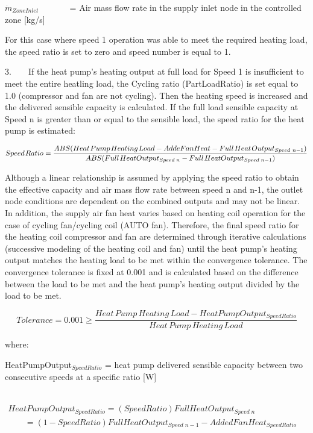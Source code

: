 \({{{\dot m}_{ZoneInlet}}}\) ~~~~~~ = Air mass flow rate in the supply inlet node in the controlled zone {[}kg/s{]}

For this case where speed 1 operation was able to meet the required heating load, the speed ratio is set to zero and speed number is equal to 1.

3.~~~~If the heat pump's heating output at full load for Speed 1 is insufficient to meet the entire heatling load, the Cycling ratio (PartLoadRatio) is set equal to 1.0 (compressor and fan are not cycling). Then the heating speed is increased and the delivered sensible capacity is calculated. If the full load sensible capacity at Speed n is greater than or equal to the sensible load, the speed ratio for the heat pump is estimated:

\begin{equation}
Speed{\kern 1pt} Ratio = \frac{{ABS(Heat{\kern 1pt} Pump{\kern 1pt} Heating{\kern 1pt} Load - AddeFanHeat - Full{\kern 1pt} Heat{\kern 1pt} Outpu{t_{Speed{\kern 1pt} \;n - 1}})}}{{ABS(Full{\kern 1pt} HeatOutpu{t_{Speed\;n}} - Full{\kern 1pt} HeatOutpu{t_{Speed\;n - 1}})}}
\end{equation}

Although a linear relationship is assumed by applying the speed ratio to obtain the effective capacity and air mass flow rate between speed n and n-1, the outlet node conditions are dependent on the combined outputs and may not be linear. In addition, the supply air fan heat varies based on heating coil operation for the case of cycling fan/cycling coil (AUTO fan). Therefore, the final speed ratio for the heating coil compressor and fan are determined through iterative calculations (successive modeling of the heating coil and fan) until the heat pump's heating output matches the heating load to be met within the convergence tolerance. The convergence tolerance is fixed at 0.001 and is calculated based on the difference between the load to be met and the heat pump's heating output divided by the load to be met.

\begin{equation}
Tolerance = 0.001 \ge \frac{{Heat\,Pump\,Heating\,Load - HeatPumpOutpu{t_{SpeedRatio}}}}{{Heat\,Pump\,Heating\,Load}}
\end{equation}

where:

HeatPumpOutput\(_{SpeedRatio}\) = heat pump delivered sensible capacity between two consecutive speeds at a specific ratio {[}W{]}

~~~~~~ \(\begin{array}{l}HeatPumpOutpu{t_{SpeedRatio}} = (SpeedRatio)FullHeatOutpu{t_{Speed\;n}}\\\;\;\;\;\;\;\; = (1 - SpeedRatio)FullHeatOutpu{t_{Speed\;n - 1}} - AddedFanHea{t_{SpeedRatio}}\end{array}\)

